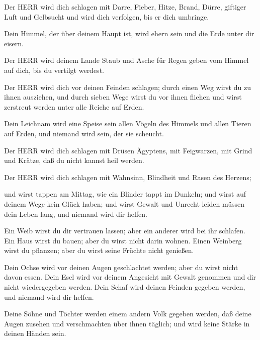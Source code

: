  Der HERR wird dich schlagen mit Darre, Fieber, Hitze,
Brand, Dürre, giftiger Luft und Gelbsucht und wird dich verfolgen, bis
er dich umbringe.

 Dein Himmel, der über deinem Haupt ist, wird ehern sein
und die Erde unter dir eisern.

 Der HERR wird deinem Lande Staub und Asche für Regen geben
vom Himmel auf dich, bis du vertilgt werdest.

 Der HERR wird dich vor deinen Feinden schlagen; durch
einen Weg wirst du zu ihnen ausziehen, und durch sieben Wege wirst du
vor ihnen fliehen und wirst zerstreut werden unter alle Reiche auf
Erden.

 Dein Leichnam wird eine Speise sein allen Vögeln des
Himmels und allen Tieren auf Erden, und niemand wird sein, der sie
scheucht.

 Der HERR wird dich schlagen mit Drüsen Ägyptens, mit
Feigwarzen, mit Grind und Krätze, daß du nicht kannst heil werden.

 Der HERR wird dich schlagen mit Wahnsinn, Blindheit und
Rasen des Herzens;

 und wirst tappen am Mittag, wie ein Blinder tappt im
Dunkeln; und wirst auf deinem Wege kein Glück haben; und wirst Gewalt
und Unrecht leiden müssen dein Leben lang, und niemand wird dir helfen.

 Ein Weib wirst du dir vertrauen lassen; aber ein anderer
wird bei ihr schlafen. Ein Haus wirst du bauen; aber du wirst nicht
darin wohnen. Einen Weinberg wirst du pflanzen; aber du wirst seine
Früchte nicht genießen.

 Dein Ochse wird vor deinen Augen geschlachtet werden; aber
du wirst nicht davon essen. Dein Esel wird vor deinem Angesicht mit
Gewalt genommen und dir nicht wiedergegeben werden. Dein Schaf wird
deinen Feinden gegeben werden, und niemand wird dir helfen.

 Deine Söhne und Töchter werden einem andern Volk gegeben
werden, daß deine Augen zusehen und verschmachten über ihnen täglich;
und wird keine Stärke in deinen Händen sein.

